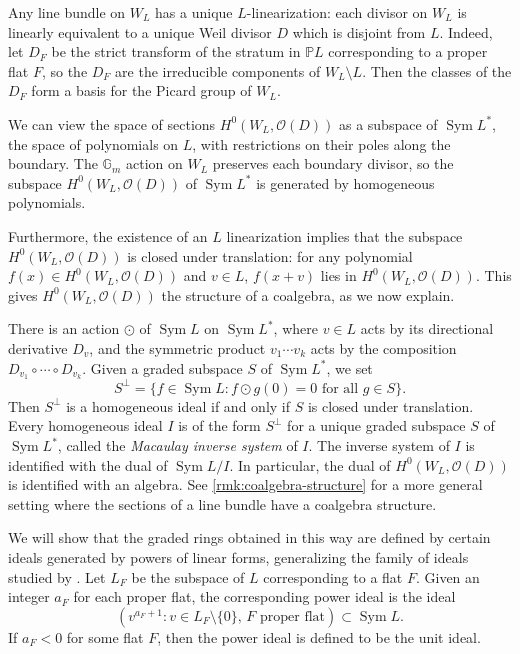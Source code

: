 \documentclass{amsart}
\theoremstyle{definition}
\begin{document}
Any line bundle on $W_L$ has a unique $L$-linearization: each divisor on $W_L$ is linearly equivalent to a unique Weil divisor $D$ which is disjoint from $L$. Indeed, let $D_F$ be the strict transform of the stratum in $\mathbb{P}L$ corresponding to a proper flat $F$, so the $D_F$ are the irreducible components of $W_L \setminus L$. Then the classes of the $D_F$ form a basis for the Picard group of $W_L$. 

We can view the space of sections $H^0(W_L, \mathcal{O}(D))$ as a subspace of $\operatorname{Sym} L^*$, the space of polynomials on $L$, with restrictions on their poles along the boundary. 
The $\mathbb{G}_m$ action on $W_L$ preserves each boundary divisor, so the subspace $H^0(W_L, \mathcal{O}(D))$ of $\operatorname{Sym} L^*$ is generated by homogeneous polynomials. 

Furthermore, the existence of an $L$ linearization implies that the subspace $H^0(W_L, \mathcal{O}(D))$ is closed under translation: for any polynomial $f(x) \in H^0(W_L, \mathcal{O}(D))$ and $v \in L$, $f(x + v)$ lies in $H^0(W_L, \mathcal{O}(D))$. This gives $H^0(W_L, \mathcal{O}(D))$ the structure of a coalgebra, as we now explain. 


There is an action $\odot$ of $\operatorname{Sym} L$ on 
$\operatorname{Sym} L^*$, where $v \in L$ acts by its directional 
derivative $D_v$, and the symmetric product $v_1  \dotsb  
v_k$ acts by the composition $D_{v_1} \circ \cdots \circ D_{v_k}$. Given 
a graded subspace $S$ of 
$\operatorname{Sym} L^*$, we set
$$S^{\perp} = \{f \in \operatorname{Sym}L : f \odot g(0) = 0 \text{ for all }g \in S\}.$$
Then $S^{\perp}$ is a homogeneous ideal if and only if $S$ is closed 
under translation. Every homogeneous ideal $I$ is of the form 
$S^{\perp}$ for a unique graded subspace $S$ of $\operatorname{Sym} L^*$, 
called the \emph{Macaulay inverse system} of $I$. The inverse system of 
$I$ is identified with the dual of $\operatorname{Sym} L/I$. In 
particular, the dual of $H^0(W_L, \mathcal{O}(D))$ is identified with an 
algebra. See \cref{rmk:coalgebra-structure} for a more general setting where the 
sections of a line bundle have a coalgebra structure.

We will show that the graded rings obtained in this way are defined by 
certain ideals generated by powers of linear forms, generalizing the 
family of ideals studied by \cite{ArdilaPostnikov}.
Let $L_F$ be the subspace of $L$ corresponding to a flat $F$. Given an integer $a_F$ for each proper flat, the corresponding power ideal is the ideal 
$$(v^{a_F + 1} : v \in L_F \setminus \{0\}, \, F \text{ proper flat}) \subset \operatorname{Sym} L.$$
If $a_F < 0$ for some flat $F$, then the power ideal is defined to be the unit ideal. 
\end{document}
